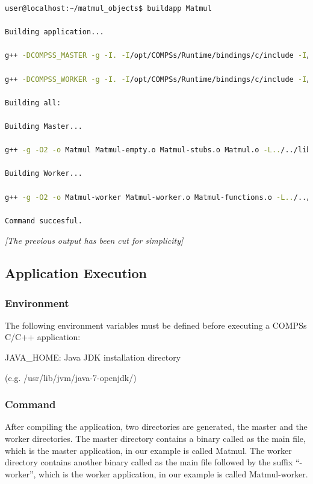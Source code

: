\begin{lstlisting}[language=bash]
user@localhost:~/matmul_objects$ buildapp Matmul

Building application...

g++ -DCOMPSS_MASTER -g -I. -I/opt/COMPSs/Runtime/bindings/c/include -I/opt/COMPSs/Runtime/bindings/bindings-common/include -c Block.cc Matrix.cc ar rvs libmaster.a Block.o Matrix.o

g++ -DCOMPSS_WORKER -g -I. -I/opt/COMPSs/Runtime/bindings/c/include -I/opt/COMPSs/Runtime/bindings/bindings-common/include -c Block.cc Matrix.cc ar rvs libworker.a Block.o Matrix.o

Building all:

Building Master...

g++ -g -O2 -o Matmul Matmul-empty.o Matmul-stubs.o Matmul.o -L../../lib -lmaster -L/usr/lib/jvm/java-6-openjdk-amd64/jre/lib/amd64/server -ljvm -ldl -L/opt/COMPSs/Runtime/bindings/c/../bindings-common/lib -lbindings_common -L/opt/COMPSs/Runtime/bindings/c/lib -lcbindings -lboost_iostreams -lboost_serialization

Building Worker...

g++ -g -O2 -o Matmul-worker Matmul-worker.o Matmul-functions.o -L../../lib -lworker -ldl -lboost_iostreams -lboost_serialization -L/opt/COMPSs/Runtime/bindings/c/lib

Command succesful.
\end{lstlisting}

\emph{[The previous output has been cut for simplicity]}


\subsection{Application Execution}
\subsubsection{Environment}
The following environment variables must be defined before executing a COMPSs C/C++ application:
            
\begin{center}
JAVA\_HOME: Java JDK installation directory 

(e.g. /usr/lib/jvm/java-7-openjdk/)
\end{center}

\subsubsection{Command}
After compiling the application, two directories are generated, the master and the worker directories. 
The master directory contains a binary called as the main file, which is the master application, in our 
example is called Matmul. The worker directory contains another binary called as the main file followed 
by the suffix ``-worker'', which is the worker application, in our example is called Matmul-worker.

